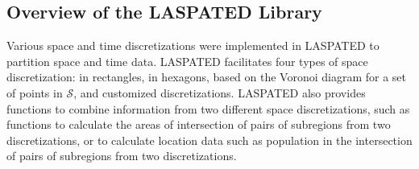 \documentclass[article]{jss}
\begin{document}
\subsection{Overview of the LASPATED Library}

Various space and time discretizations were implemented in LASPATED to partition space and time data.
LASPATED facilitates four types of space discretization: in rectangles, in hexagons, based on the Voronoi diagram for a set of points in $\mathcal{S}$, and customized discretizations.
LASPATED also provides functions to combine information from two different space discretizations, such as functions to calculate the areas of intersection of pairs of subregions from two discretizations, or to calculate location data such as population in the intersection of pairs of subregions from two discretizations.
\end{document}

